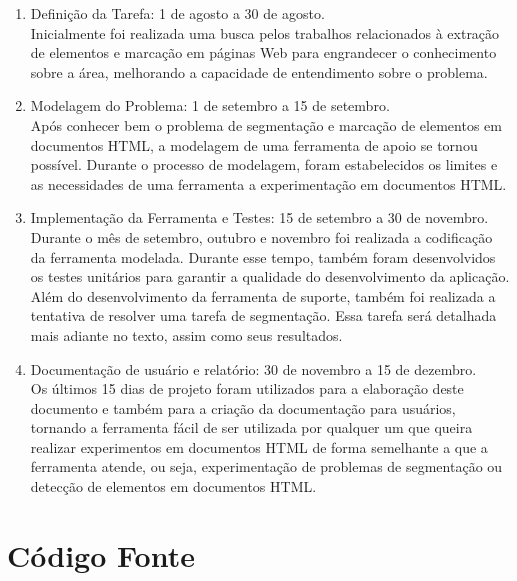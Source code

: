 \documentclass[12pt, a4paper]{article}
\begin{document}
\begin{enumerate}
\item Definição da Tarefa: 1 de agosto a 30 de agosto. \\
Inicialmente foi realizada uma busca pelos trabalhos relacionados à
extração de elementos e marcação em páginas Web para engrandecer o
conhecimento sobre a área, melhorando a capacidade de entendimento
sobre o problema.

\item Modelagem do Problema: 1 de setembro a 15 de setembro. \\ 
Após conhecer bem o problema de segmentação e marcação de elementos em
documentos HTML, a modelagem de uma ferramenta de apoio se tornou possível.
Durante o processo de modelagem, foram estabelecidos os limites e as
necessidades de uma ferramenta a experimentação em documentos HTML.

\item Implementação da Ferramenta e Testes: 15 de setembro a 30 de
novembro. \\
Durante o mês de setembro, outubro e novembro foi realizada a
codificação da ferramenta modelada. Durante esse tempo, também foram
desenvolvidos os testes unitários para garantir a qualidade do
desenvolvimento da aplicação. Além do desenvolvimento da ferramenta de
suporte, também foi realizada a tentativa de resolver uma tarefa de
segmentação. Essa tarefa será detalhada mais adiante no texto, assim como
seus resultados.

\item Documentação de usuário e relatório: 30 de novembro a 15 de
dezembro. \\
Os últimos 15 dias de projeto foram utilizados para a elaboração deste
documento e também para a criação da documentação para usuários,
tornando a ferramenta fácil de ser utilizada por qualquer um que
queira realizar experimentos em documentos HTML de forma semelhante a
que a ferramenta atende, ou seja, experimentação de problemas de
segmentação ou detecção de elementos em documentos HTML.
\end{enumerate}

\section{Código Fonte}

\end{document}
